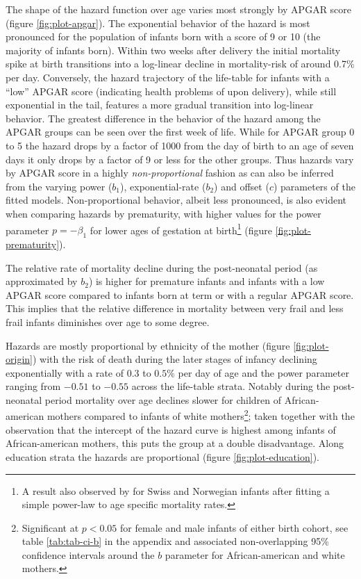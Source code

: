 \documentclass[smallextended]{svjour3} %
\begin{document}
The shape of the hazard function over age varies most strongly by APGAR
score (figure \ref{fig:plot-apgar}). The exponential behavior of the
hazard is most pronounced for the population of infants born with a
score of 9 or 10 (the majority of infants born). Within two weeks after
delivery the initial mortality spike at birth transitions into a
log-linear decline in mortality-risk of around 0.7\% per day.
Conversely, the hazard trajectory of the life-table for infants with a
``low'' APGAR score (indicating health problems of upon delivery), while
still exponential in the tail, features a more gradual transition into
log-linear behavior. The greatest difference in the behavior of the
hazard among the APGAR groups can be seen over the first week of life.
While for APGAR group 0 to 5 the hazard drops by a factor of 1000 from
the day of birth to an age of seven days it only drops by a factor of 9
or less for the other groups. Thus hazards vary by APGAR score in a
highly \emph{non-proportional} fashion as can also be inferred from the
varying power (\(b_1\)), exponential-rate (\(b_2\)) and offset (\(c\))
parameters of the fitted models. Non-proportional behavior, albeit less
pronounced, is also evident when comparing hazards by prematurity, with
higher values for the power parameter \(p=-\beta_1\) for lower ages of
gestation at birth\footnote{A result also observed by \citet{Berrut2016}
  for Swiss and Norwegian infants after fitting a simple power-law to
  age specific mortality rates.} (figure \ref{fig:plot-prematurity}).

The relative rate of mortality decline during the post-neonatal period
(as approximated by \(b_2\)) is higher for premature infants and infants
with a low APGAR score compared to infants born at term or with a
regular APGAR score. This implies that the relative difference in
mortality between very frail and less frail infants diminishes over age
to some degree.

Hazards are mostly proportional by ethnicity of the mother (figure
\ref{fig:plot-origin}) with the risk of death during the later stages of
infancy declining exponentially with a rate of \(0.3\) to \(0.5\%\) per
day of age and the power parameter ranging from \(-0.51\) to \(-0.55\)
across the life-table strata. Notably during the post-neonatal period
mortality over age declines slower for children of African-american
mothers compared to infants of white mothers\footnote{Significant at
  \(p<0.05\) for female and male infants of either birth cohort, see
  table \ref{tab:tab-ci-b} in the appendix and associated
  non-overlapping 95\% confidence intervals around the \(b\) parameter
  for African-american and white mothers.}; taken together with the
observation that the intercept of the hazard curve is highest among
infants of African-american mothers, this puts the group at a double
disadvantage. Along education strata the hazards are proportional
(figure \ref{fig:plot-education}).
\end{document}
